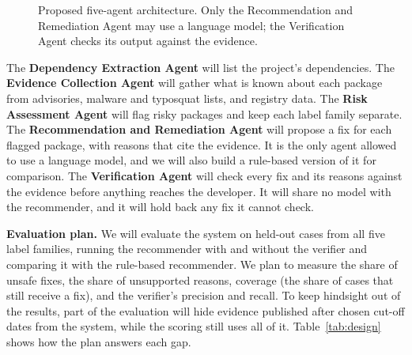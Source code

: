 \documentclass[conference]{IEEEtran}
\begin{document}
\begin{figure}[t]
\centering
{}
\caption{Proposed five-agent architecture. Only the Recommendation and Remediation Agent may use a language model;
the Verification Agent checks its output against the evidence.}
\label{fig:proposed}
\end{figure}

The \textbf{Dependency Extraction Agent} will list the project's dependencies. The \textbf{Evidence Collection
Agent} will gather what is known about each package from advisories, malware and typosquat lists, and registry
data. The \textbf{Risk Assessment Agent} will flag risky packages and keep each label family separate. The
\textbf{Recommendation and Remediation Agent} will propose a fix for each flagged package, with reasons that cite
the evidence. It is the only agent allowed to use a language model, and we will also build a rule-based version of
it for comparison. The \textbf{Verification Agent} will check every fix and its reasons against the evidence
before anything reaches the developer. It will share no model with the recommender, and it will hold back any fix
it cannot check.

\textbf{Evaluation plan.} We will evaluate the system on held-out cases from all five label families, running the
recommender with and without the verifier and comparing it with the rule-based recommender. We plan to measure the
share of unsafe fixes, the share of unsupported reasons, coverage (the share of cases that still receive a fix),
and the verifier's precision and recall. To keep hindsight out of the results, part of the evaluation will hide
evidence published after chosen cut-off dates from the system, while the scoring still uses all of it.
Table~\ref{tab:design} shows how the plan answers each gap.
\end{document}
